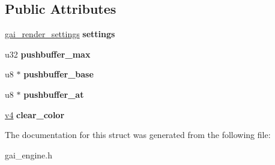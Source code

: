 \subsection*{Public Attributes}
\begin{DoxyCompactItemize}
\item 
\mbox{\label{structgai__render__commands_abdcadaebc26e8673763975e406c56b0c}} 
\hyperlink{structgai__render__settings}{gai\+\_\+render\+\_\+settings} {\bfseries settings}
\item 
\mbox{\label{structgai__render__commands_a05da5b761fee8979f03aea81fc18e7e2}} 
u32 {\bfseries pushbuffer\+\_\+max}
\item 
\mbox{\label{structgai__render__commands_a8cdb202f3a17cdc5ff2cc5fdfbbb9182}} 
u8 $\ast$ {\bfseries pushbuffer\+\_\+base}
\item 
\mbox{\label{structgai__render__commands_a6b900436d146ec352a75d875c8908a91}} 
u8 $\ast$ {\bfseries pushbuffer\+\_\+at}
\item 
\mbox{\label{structgai__render__commands_a3f036f20e85d6497ab888f0dd3772056}} 
\hyperlink{unionv4}{v4} {\bfseries clear\+\_\+color}
\end{DoxyCompactItemize}


The documentation for this struct was generated from the following file\+:\begin{DoxyCompactItemize}
\item 
gai\+\_\+engine.\+h\end{DoxyCompactItemize}
